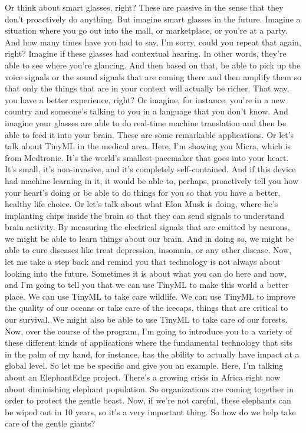 Or think about smart glasses, right?
These are passive in the sense that they don't proactively do anything.
But imagine smart glasses in the future.
Imagine a situation where you go out into the mall, or marketplace, or you're at a party.
And how many times have you had to say, I'm sorry, could you repeat that again, right?
Imagine if these glasses had contextual hearing.
In other words, they're able to see where you're glancing.
And then based on that, be able to pick up the voice signals or the sound signals that are coming there and then amplify them so that only the things that are in your context will actually be richer.
That way, you have a better experience, right?
Or imagine, for instance, you're in a new country and someone's talking to you in a language that you don't know.
And imagine your glasses are able to do real-time machine translation and then be able to feed it into your brain.
These are some remarkable applications.
Or let's talk about TinyML in the medical area.
Here, I'm showing you Micra, which is from Medtronic.
It's the world's smallest pacemaker that goes into your heart.
It's small, it's non-invasive, and it's completely self-contained.
And if this device had machine learning in it, it would be able to, perhaps, proactively tell you how your heart's doing or be able to do things for you so that you have a better, healthy life choice.
Or let's talk about what Elon Musk is doing, where he's implanting chips inside the brain so that they can send signals to understand brain activity.
By measuring the electrical signals that are emitted by neurons, we might be able to learn things about our brain.
And in doing so, we might be able to cure diseases like treat depression, insomnia, or any other disease.
Now, let me take a step back and remind you that technology is not always about looking into the future.
Sometimes it is about what you can do here and now, and I'm going to tell you that we can use TinyML to make this world a better place.
We can use TinyML to take care wildlife.
We can use TinyML to improve the quality of our oceans or take care of the icecaps, things that are critical to our survival.
We might also be able to use TinyML to take care of our forests.
Now, over the course of the program, I'm going to introduce you to a variety of these different kinds of applications where the fundamental technology that sits in the palm of my hand, for instance, has the ability to actually have impact at a global level.
So let me be specific and give you an example.
Here, I'm talking about an ElephantEdge project.
There's a growing crisis in Africa right now about diminishing elephant population.
So organizations are coming together in order to protect the gentle beast.
Now, if we're not careful, these elephants can be wiped out in 10 years, so it's a very important thing.
So how do we help take care of the gentle giants?

